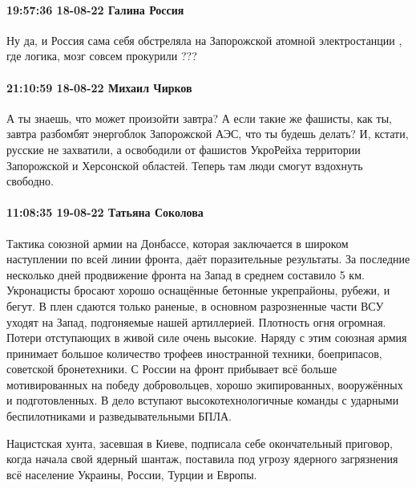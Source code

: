 \paragraph{19:57:36 18-08-22 Галина Россия}

Ну да, и Россия сама себя обстреляла на Запорожской атомной электростанции ,
где логика, мозг совсем прокурили ???

\paragraph{21:10:59 18-08-22 Михаил Чирков}

А ты знаешь, что может произойти завтра?
А если такие же фашисты, как ты, завтра разбомбят энергоблок Запорожской АЭС, что ты будешь делать?
И, кстати, русские не захватили, а освободили от фашистов УкроРейха территории Запорожской и Херсонской областей.
Теперь там люди смогут вздохнуть свободно.

\paragraph{11:08:35 19-08-22 Татьяна Соколова}

Тактика союзной армии на Донбассе, которая заключается в широком наступлении по
всей линии фронта, даёт поразительные результаты. За последние несколько дней
продвижение фронта на Запад в среднем составило 5 км. Укронацисты бросают
хорошо оснащённые бетонные укрепрайоны, рубежи, и бегут. В плен сдаются только
раненые, в основном разрозненные части ВСУ уходят на Запад, подгоняемые нашей
артиллерией. Плотность огня огромная. Потери отступающих в живой силе очень
высокие. Наряду с этим союзная армия принимает большое количество трофеев
иностранной техники, боеприпасов, советской бронетехники. С России на фронт
прибывает всё больше мотивированных на победу добровольцев, хорошо
экипированных, вооружённых и подготовленных. В дело вступают
высокотехнологичные команды с ударными беспилотниками и разведывательными БПЛА.

Нацистская хунта, засевшая в Киеве, подписала себе окончательный приговор,
когда начала свой ядерный шантаж, поставила под угрозу ядерного загрязнения всё
население Украины, России, Турции и Европы.

